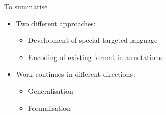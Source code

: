 \documentclass[final,nocolorBG,a4,marieke,nototal,ps, accumulate,slideColor]{prosper}
\begin{document}

\begin{slide}{To summarise}
\begin{itemize}
\item Two different approaches: 
\begin{itemize}
\item Development of special targeted language 
\item Encoding of existing format in annotations
\end{itemize}
\item Work continues in different directions:
\begin{itemize}
\item Generalisation
\item Formalisation
\end{itemize}
\end{itemize}
\end{slide}
\end{document}
